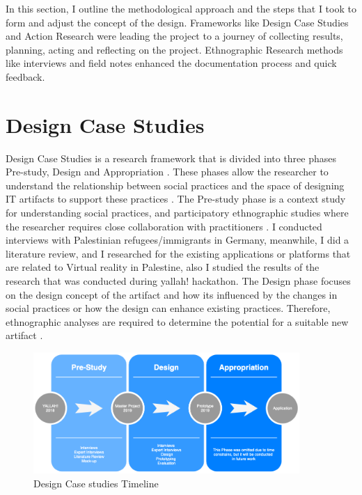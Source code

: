 In this section, I outline the methodological approach and the steps that I took to form and adjust the concept of the design. Frameworks like Design Case Studies and Action Research were leading the project to a journey of collecting results, planning, acting and reflecting on the project. Ethnographic Research methods like interviews and field notes enhanced the documentation process and quick feedback. 

\section{Design Case Studies}

Design Case Studies is a research framework that is divided into three phases Pre-study, Design and Appropriation \citep{Wulf2011}. These phases allow the researcher to understand the relationship between social practices and the space of designing IT artifacts to support these practices \citep{Volker2013}. The Pre-study phase is a context study for understanding social practices, and participatory ethnographic studies where the researcher requires close collaboration with practitioners \citep{Rohde2017GroundedPerspective, Wulf2011}. I conducted interviews with Palestinian refugees/immigrants in Germany, meanwhile, I did a literature review, and I researched for the existing applications or platforms that are related to Virtual reality in Palestine, also I studied the results of the research that was conducted during \acrfull{yallah!} hackathon. The Design phase focuses on the design concept of the artifact and how its influenced by the changes in social practices or how the design can enhance existing practices. Therefore, ethnographic analyses are required to determine the potential for a suitable new artifact \citep{Rohde2017GroundedPerspective, Wulf2011}.
\begin{figure}[ht]
    \centering
    \includegraphics[width=0.90\textwidth]{images/DCS_Diagram.png}
    \caption{Design Case studies Timeline}
    \label{fig:dcs}
\end{figure}


